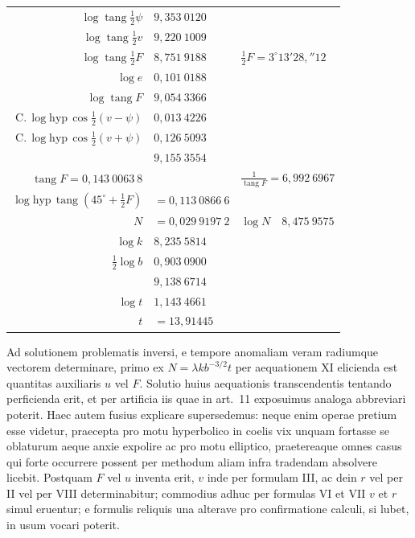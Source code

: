 \documentclass[12pt,a4paper]{book}
\newcommand{\tang}{\operatorname{tang}}
\newcommand{\Compl}{\mathrm{C.}\,}
\newcommand{\hyp}{\mathrm{hyp}\,}
\begin{document}
\begin{center}
\begin{tabular}{@{}r@{\quad}l@{\quad}l@{}}
$\log\tang\tfrac{1}{2}\psi$ & $9{,}353\ 0120$ & \\
$\log\tang\tfrac{1}{2}v$ & $9{,}220\ 1009$ & \\
$\log\tang\tfrac{1}{2}F$ & $8{,}751\ 9188$ & $\tfrac{1}{2}F=3^{\circ}13'28{,}''12$ \\
$\log e$ & $0{,}101\ 0188$ & \\
$\log\tang F$ & $9{,}054\ 3366$ & \\
$\Compl\log\hyp\cos\tfrac{1}{2}(v-\psi)$ & $0{,}013\ 4226$ & \\
$\Compl\log\hyp\cos\tfrac{1}{2}(v+\psi)$ & $0{,}126\ 5093$ & \\
& $9{,}155\ 3554$ & \\
$\tang F=0{,}143\ 0063\ 8$ & & $\frac{1}{\tang F}=6{,}992\ 6967$ \\
$\log\hyp\tang(45^{\circ}+\tfrac{1}{2}F)$ & $=0{,}113\ 0866\ 6$ & \\
$N$ & $=0{,}029\ 9197\ 2$ & $\log N \quad 8{,}475\ 9575$ \\[0.5ex]
$\log k$ & $8{,}235\ 5814$ & \\
$\tfrac{1}{2}\log b$ & $0{,}903\ 0900$ & \\
& $9{,}138\ 6714$ & \\
$\log t$ & $1{,}143\ 4661$ & \\
$t$ & $=13{,}91445$ &
\end{tabular}
\end{center}

Ad solutionem problematis inversi, e tempore anomaliam veram radiumque vectorem determinare, primo ex $N=\lambda kb^{-3/2}t$ per aequationem XI elicienda est quantitas auxiliaris $u$ vel $F$. Solutio huius aequationis transcendentis tentando perficienda erit, et per artificia iis quae in art.~11 exposuimus analoga abbreviari poterit. Haec autem fusius explicare supersedemus: neque enim operae pretium esse videtur, praecepta pro motu hyperbolico in coelis vix unquam fortasse se oblaturum aeque anxie expolire ac pro motu elliptico, praetereaque omnes casus qui forte occurrere possent per methodum aliam infra tradendam absolvere licebit. Postquam $F$ vel $u$ inventa erit, $v$ inde per formulam III, ac dein $r$ vel per II vel per VIII determinabitur; commodius adhuc per formulas VI et VII $v$ et $r$ simul eruentur; e formulis reliquis una alterave pro confirmatione calculi, si lubet, in usum vocari poterit.
\end{document}
